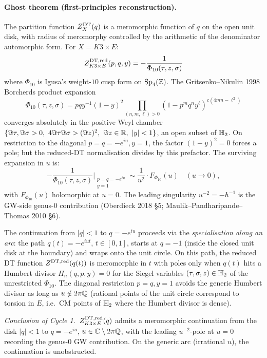 \paragraph{Ghost theorem (first-principles reconstruction).}
The partition function $Z^{\mathrm{DT}}_X(q)$ is a meromorphic function of
$q$ on the open unit disk, with radius of meromorphy controlled
by the arithmetic of the denominator automorphic form. For
$X=K3\times E$:
\[
Z^{\mathrm{DT},\mathrm{red}}_{K3\times E}(p,q,y)=-\frac{1}{\Phi_{10}(\tau,z,\sigma)}
\]
where $\Phi_{10}$ is Igusa's weight-$10$ cusp form on $\mathrm{Sp}_4(\mathbb{Z})$.
The Gritsenko--Nikulin 1998 Borcherds product expansion
\[
\Phi_{10}(\tau,z,\sigma)=pqy^{-1}(1-y)^2
\prod_{(n,m,\ell)>0}(1-p^m q^n y^\ell)^{c(4mn-\ell^2)}
\]
converges absolutely in the positive Weyl chamber
$\{\Im\tau,\Im\sigma>0,\ 4\Im\tau\Im\sigma>(\Im z)^2,\ \Im z\in\R,\ |y|<1\}$,
an open subset of $\mathbb{H}_2$. On restriction to the diagonal
$p=q=-e^{iu},y=1$, the factor $(1-y)^2=0$ forces a pole; but
the reduced-DT normalisation divides by this prefactor. The
surviving expansion in $u$ is:
\[
-\frac{1}{\Phi_{10}(\tau,z,\sigma)}\bigg|_{\substack{p=q=-e^{iu}\\y=1}}
\sim \frac{1}{u^2}\cdot F_{\Phi_{10}}(u)\quad(u\to 0),
\]
with $F_{\Phi_{10}}(u)$ holomorphic at $u=0$. The leading
singularity $u^{-2}=-\hbar^{-1}$ is the GW-side genus-$0$
contribution (Oberdieck 2018 \S5; Maulik--Pandharipande--Thomas
2010 \S6).

The continuation from $|q|<1$ to $q=-e^{iu}$ proceeds via the
\emph{specialisation along an arc}: the path
$q(t)=-e^{iut}$, $t\in[0,1]$, starts at $q=-1$ (inside the closed
unit disk at the boundary) and wraps onto the unit circle. On
this path, the reduced DT function $Z^{\mathrm{DT},\mathrm{red}}(q(t))$ is
meromorphic in $t$ with poles only when $q(t)$ hits a Humbert
divisor $H_n(q,p,y)=0$ for the Siegel variables
$(\tau,\sigma,z)\in\mathbb{H}_2$ of the unrestricted $\Phi_{10}$. The
diagonal restriction $p=q,y=1$ avoids the generic Humbert divisor
as long as $u\notin 2\pi\mathbb{Q}$ (rational points of the unit circle
correspond to torsion in $E$, i.e.\ CM points of $\mathbb{H}_2$ where
the Humbert divisor is dense).

\emph{Conclusion of Cycle 1.}\ $Z^{\mathrm{DT},\mathrm{red}}_{K3\times E}(q)$
admits a meromorphic continuation from the disk $|q|<1$ to
$q=-e^{iu}$, $u\in\mathbb{C}\setminus 2\pi\mathbb{Q}$, with the leading
$u^{-2}$-pole at $u=0$ recording the genus-$0$ GW contribution.
On the generic arc (irrational $u$), the continuation is
unobstructed.

